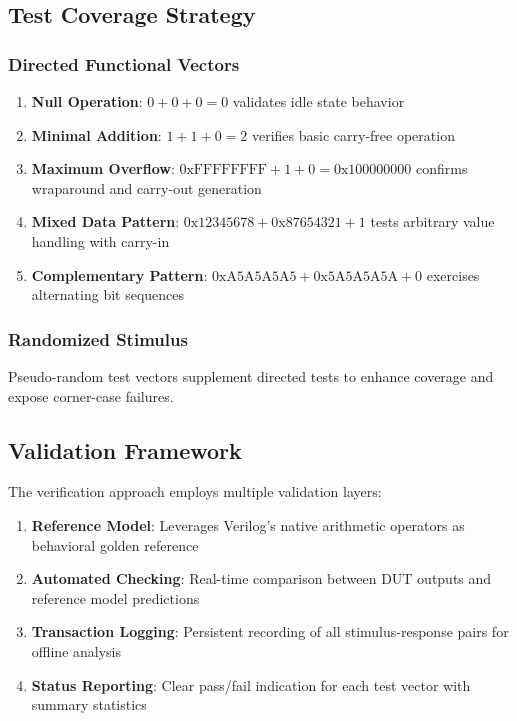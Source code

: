 \documentclass[a4paper, 11pt]{article}
\begin{document}
\subsection{Test Coverage Strategy}

\subsubsection{Directed Functional Vectors}

\begin{enumerate}
    \item \textbf{Null Operation}: $0 + 0 + 0 = 0$ validates idle state behavior
    \item \textbf{Minimal Addition}: $1 + 1 + 0 = 2$ verifies basic carry-free operation
    \item \textbf{Maximum Overflow}: $\text{0xFFFFFFFF} + 1 + 0 = \text{0x100000000}$ confirms wraparound and carry-out generation
    \item \textbf{Mixed Data Pattern}: $\text{0x12345678} + \text{0x87654321} + 1$ tests arbitrary value handling with carry-in
    \item \textbf{Complementary Pattern}: $\text{0xA5A5A5A5} + \text{0x5A5A5A5A} + 0$ exercises alternating bit sequences
\end{enumerate}

\subsubsection{Randomized Stimulus}

Pseudo-random test vectors supplement directed tests to enhance coverage and expose corner-case failures.

\subsection{Validation Framework}

The verification approach employs multiple validation layers:

\begin{enumerate}
    \item \textbf{Reference Model}: Leverages Verilog's native arithmetic operators as behavioral golden reference
    \item \textbf{Automated Checking}: Real-time comparison between DUT outputs and reference model predictions
    \item \textbf{Transaction Logging}: Persistent recording of all stimulus-response pairs for offline analysis
    \item \textbf{Status Reporting}: Clear pass/fail indication for each test vector with summary statistics
\end{enumerate}
\end{document}
